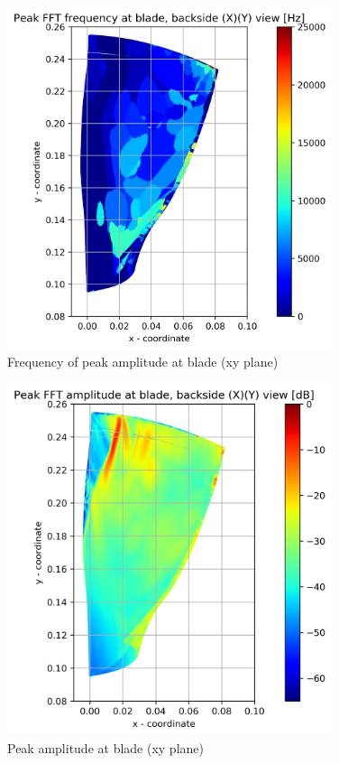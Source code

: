 \begin{figure}[ht]
	\centering
	\includegraphics[width=0.85\textwidth]{Figures/blade-xy-peak-freq.png}
	\caption{Frequency of peak amplitude at blade (xy plane)} \label{blade-xy-peak-freq}
\end{figure}

\begin{figure}[ht]
	\centering
	\includegraphics[width=0.85\textwidth]{Figures/blade-xy-peak-mag.png}
	\caption{Peak amplitude at blade (xy plane)} \label{blade-xy-peak-mag}
\end{figure}

